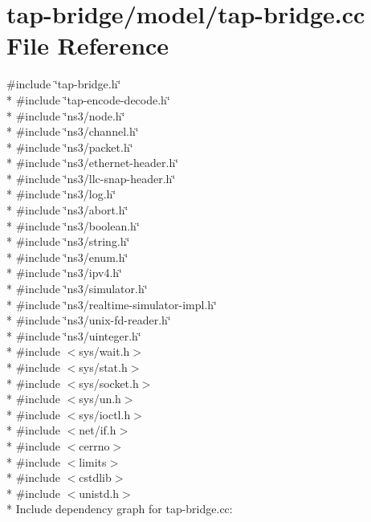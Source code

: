 \hypertarget{tap-bridge_8cc}{}\section{tap-\/bridge/model/tap-\/bridge.cc File Reference}
\label{tap-bridge_8cc}
{\ttfamily \#include \char`\"{}tap-\/bridge.\+h\char`\"{}}\\*
{\ttfamily \#include \char`\"{}tap-\/encode-\/decode.\+h\char`\"{}}\\*
{\ttfamily \#include \char`\"{}ns3/node.\+h\char`\"{}}\\*
{\ttfamily \#include \char`\"{}ns3/channel.\+h\char`\"{}}\\*
{\ttfamily \#include \char`\"{}ns3/packet.\+h\char`\"{}}\\*
{\ttfamily \#include \char`\"{}ns3/ethernet-\/header.\+h\char`\"{}}\\*
{\ttfamily \#include \char`\"{}ns3/llc-\/snap-\/header.\+h\char`\"{}}\\*
{\ttfamily \#include \char`\"{}ns3/log.\+h\char`\"{}}\\*
{\ttfamily \#include \char`\"{}ns3/abort.\+h\char`\"{}}\\*
{\ttfamily \#include \char`\"{}ns3/boolean.\+h\char`\"{}}\\*
{\ttfamily \#include \char`\"{}ns3/string.\+h\char`\"{}}\\*
{\ttfamily \#include \char`\"{}ns3/enum.\+h\char`\"{}}\\*
{\ttfamily \#include \char`\"{}ns3/ipv4.\+h\char`\"{}}\\*
{\ttfamily \#include \char`\"{}ns3/simulator.\+h\char`\"{}}\\*
{\ttfamily \#include \char`\"{}ns3/realtime-\/simulator-\/impl.\+h\char`\"{}}\\*
{\ttfamily \#include \char`\"{}ns3/unix-\/fd-\/reader.\+h\char`\"{}}\\*
{\ttfamily \#include \char`\"{}ns3/uinteger.\+h\char`\"{}}\\*
{\ttfamily \#include $<$sys/wait.\+h$>$}\\*
{\ttfamily \#include $<$sys/stat.\+h$>$}\\*
{\ttfamily \#include $<$sys/socket.\+h$>$}\\*
{\ttfamily \#include $<$sys/un.\+h$>$}\\*
{\ttfamily \#include $<$sys/ioctl.\+h$>$}\\*
{\ttfamily \#include $<$net/if.\+h$>$}\\*
{\ttfamily \#include $<$cerrno$>$}\\*
{\ttfamily \#include $<$limits$>$}\\*
{\ttfamily \#include $<$cstdlib$>$}\\*
{\ttfamily \#include $<$unistd.\+h$>$}\\*
Include dependency graph for tap-\/bridge.cc\+:

